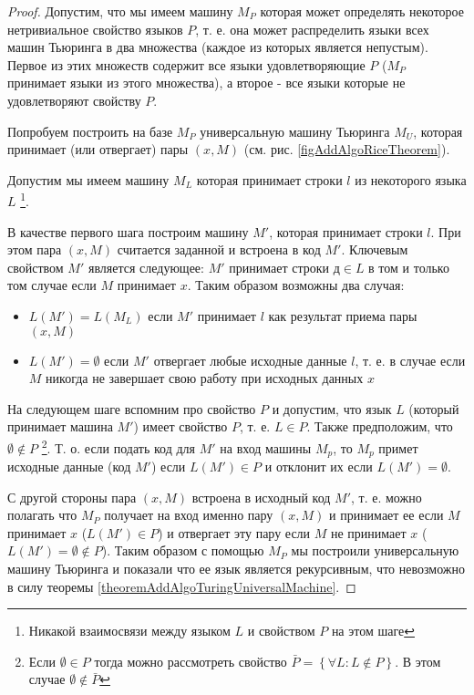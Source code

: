 \begin{proof}
Допустим, что мы имеем машину $M_P$ которая может определять
некоторое нетривиальное свойство языков $P$, т. е. она может
распределить языки всех 
машин Тьюринга в два множества (каждое из которых является непустым). 
Первое из этих множеств содержит все языки удовлетворяющие $P$ ($M_P$
принимает языки из этого множества), а второе - все языки которые не
удовлетворяют свойству $P$. 



Попробуем построить на базе $M_P$ универсальную машину Тьюринга $M_U$,
которая принимает (или отвергает) пары $\left(x, M\right)$ 
(см. рис. \ref{figAddAlgoRiceTheorem}).

Допустим мы имеем машину $M_L$ которая принимает строки $l$ из
некоторого языка $L$
\footnote{Никакой взаимосвязи между языком $L$ и свойством $P$ на этом шаге}.

В качестве первого шага построим машину $M'$, которая принимает строки
$l$. При этом пара $\left(x, M\right)$ считается заданной и встроена в
код $M'$. Ключевым свойством $M'$ является следующее: $M'$ принимает
строки $д \in L$ в том и только том случае если $M$ 
принимает $x$. Таким образом возможны два случая:
\begin{itemize}
\item $L(M') = L(M_L)$ если $M'$ принимает $l$ как результат приема
  пары $\left(x, M\right)$ 
\item $L(M') = \emptyset$ если $M'$ отвергает любые исходные данные
  $l$,
т. е. в случае если $M$ никогда не завершает свою работу при исходных
данных $x$ 
\end{itemize}

На следующем шаге вспомним про свойство $P$ и допустим, что язык $L$
(который принимает машина $M'$) имеет свойство $P$, т. е. $L \in
P$. Также предположим, что $\emptyset \notin P$
\footnote{
Если $\emptyset \in P$ тогда можно рассмотреть свойство 
$\bar{P} = \left\{\forall L: L \notin P\right\}$. В этом случае
$\emptyset \notin \bar{P}$
}. 
Т. о. если подать код
для $M'$ на вход машины $M_p$, то $M_p$ примет исходные данные (код
$M'$) если $L(M') \in P$ и отклонит их если $L(M') = \emptyset$.

С другой стороны пара $\left(x, M\right)$ встроена в исходный код
$M'$, т. е. можно полагать что $M_P$ получает на вход именно пару 
$\left(x, M\right)$ и принимает ее если $M$ принимает $x$
($L\left(M'\right) \in P$) и отвергает
эту пару если $M$ не принимает $x$ 
($L\left(M'\right) = \emptyset \notin P$). Таким образом с помощью
$M_P$ мы построили универсальную машину Тьюринга и показали что ее
язык является рекурсивным, что невозможно в силу теоремы 
\ref{theoremAddAlgoTuringUniversalMachine}.
\end{proof}

